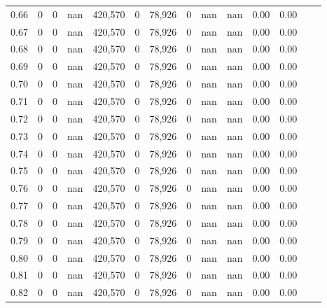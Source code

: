 \begin{tabular}{rrrrrrrrrrrrrr}
0.66 &       0 &      0 &     nan &  420,570 &        0 &  78,926 &       0 &   nan &   nan &  0.00 &      0.00 \\
0.67 &       0 &      0 &     nan &  420,570 &        0 &  78,926 &       0 &   nan &   nan &  0.00 &      0.00 \\
0.68 &       0 &      0 &     nan &  420,570 &        0 &  78,926 &       0 &   nan &   nan &  0.00 &      0.00 \\
0.69 &       0 &      0 &     nan &  420,570 &        0 &  78,926 &       0 &   nan &   nan &  0.00 &      0.00 \\
0.70 &       0 &      0 &     nan &  420,570 &        0 &  78,926 &       0 &   nan &   nan &  0.00 &      0.00 \\
0.71 &       0 &      0 &     nan &  420,570 &        0 &  78,926 &       0 &   nan &   nan &  0.00 &      0.00 \\
0.72 &       0 &      0 &     nan &  420,570 &        0 &  78,926 &       0 &   nan &   nan &  0.00 &      0.00 \\
0.73 &       0 &      0 &     nan &  420,570 &        0 &  78,926 &       0 &   nan &   nan &  0.00 &      0.00 \\
0.74 &       0 &      0 &     nan &  420,570 &        0 &  78,926 &       0 &   nan &   nan &  0.00 &      0.00 \\
0.75 &       0 &      0 &     nan &  420,570 &        0 &  78,926 &       0 &   nan &   nan &  0.00 &      0.00 \\
0.76 &       0 &      0 &     nan &  420,570 &        0 &  78,926 &       0 &   nan &   nan &  0.00 &      0.00 \\
0.77 &       0 &      0 &     nan &  420,570 &        0 &  78,926 &       0 &   nan &   nan &  0.00 &      0.00 \\
0.78 &       0 &      0 &     nan &  420,570 &        0 &  78,926 &       0 &   nan &   nan &  0.00 &      0.00 \\
0.79 &       0 &      0 &     nan &  420,570 &        0 &  78,926 &       0 &   nan &   nan &  0.00 &      0.00 \\
0.80 &       0 &      0 &     nan &  420,570 &        0 &  78,926 &       0 &   nan &   nan &  0.00 &      0.00 \\
0.81 &       0 &      0 &     nan &  420,570 &        0 &  78,926 &       0 &   nan &   nan &  0.00 &      0.00 \\
0.82 &       0 &      0 &     nan &  420,570 &        0 &  78,926 &       0 &   nan &   nan &  0.00 &      0.00 \\

\end{tabular}
